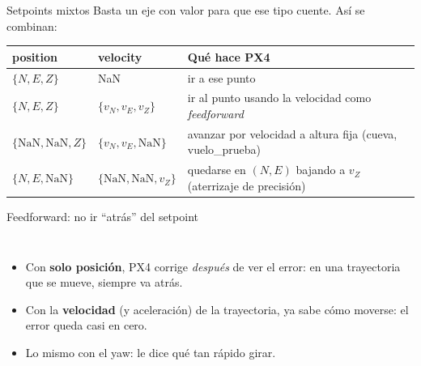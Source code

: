 \begin{frame}{Setpoints mixtos}
  \small Basta un eje con valor para que ese tipo cuente. Así se combinan:
  \vspace{0.3em}
  \centering
  \begin{tabular}{lll}
    \toprule
    position & velocity & Qué hace PX4 \\
    \midrule
    $\{N, E, Z\}$ & NaN & ir a ese punto \\
    $\{N, E, Z\}$ & $\{v_N, v_E, v_Z\}$ & ir al punto usando la velocidad como \emph{feedforward} \\
    $\{\text{NaN}, \text{NaN}, Z\}$ & $\{v_N, v_E, \text{NaN}\}$ & avanzar por velocidad a altura fija (cueva, vuelo\_prueba) \\
    $\{N, E, \text{NaN}\}$ & $\{\text{NaN}, \text{NaN}, v_Z\}$ & quedarse en $(N, E)$ bajando a $v_Z$ (aterrizaje de precisión) \\
    \bottomrule
  \end{tabular}
\end{frame}

\begin{frame}{Feedforward: no ir ``atrás'' del setpoint}
  \begin{columns}[c]
    \small
    \begin{itemize}
      \item Con \textbf{solo posición}, PX4 corrige \emph{después} de ver el error: en una
        trayectoria que se mueve, siempre va atrás.
      \item Con la \textbf{velocidad} (y aceleración) de la trayectoria, ya sabe cómo moverse:
        el error queda casi en cero.
      \item Lo mismo con el yaw:  le dice qué tan rápido girar.
    \end{itemize}
  \end{columns}
\end{frame}

